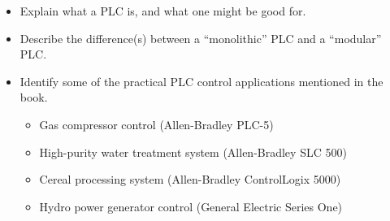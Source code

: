\begin{itemize}
\item{} Explain what a PLC is, and what one might be good for.
\item{} Describe the difference(s) between a ``monolithic'' PLC and a ``modular'' PLC.
\item{} Identify some of the practical PLC control applications mentioned in the book.
\begin{itemize}

\item{} Gas compressor control (Allen-Bradley PLC-5)
\item{} High-purity water treatment system (Allen-Bradley SLC 500)
\item{} Cereal processing system (Allen-Bradley ControlLogix 5000)
\item{} Hydro power generator control (General Electric Series One)
\end{itemize}
\end{itemize}



